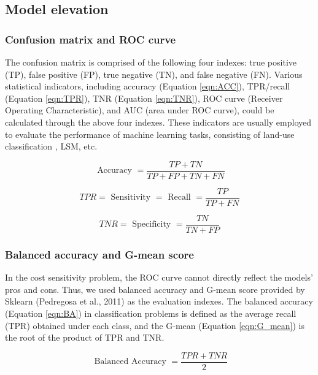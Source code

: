 \documentclass[a4paper,fleqn]{cas-sc}
\begin{document}
\subsection{Model elevation}
\subsubsection{Confusion matrix and ROC curve}

The confusion matrix is comprised of the following four indexes: true positive (TP), false positive (FP), true negative (TN), and false negative (FN). 
Various statistical indicators, including accuracy (Equation \ref{eqn:ACC}), TPR/recall (Equation \ref{eqn:TPR}), TNR (Equation \ref{eqn:TNR}), ROC curve (Receiver Operating Characteristic), and AUC (area under ROC curve), could be calculated through the above four indexes. 
These indicators are usually employed to evaluate the performance of machine learning tasks, consisting of land-use classification \citep{Jr2014IJoGIS}, LSM, etc.

\begin{equation}
  \text { Accuracy }=\frac{T P+T N}{T P+F P+T N+F N}
  \label{eqn:ACC}
\end{equation}

\begin{equation}
  T P R=\text { Sensitivity }=\text { Recall }=\frac{T P}{T P+F N}
  \label{eqn:TPR}
\end{equation}

\begin{equation}
  T N R=\text { Specificity }=\frac{T N}{T N+F P}
  \label{eqn:TNR}
\end{equation}

\subsubsection{Balanced accuracy and G-mean score}

In the cost sensitivity problem, the ROC curve cannot directly reflect the models' pros and cons. 
Thus, we used balanced accuracy and G-mean score provided by Sklearn (Pedregosa et al., 2011) as the evaluation indexes. The balanced accuracy (Equation \ref{eqn:BA}) in classification problems is defined as the average recall (TPR) obtained under each class, and the G-mean (Equation \ref{eqn:G_mean}) is the root of the product of TPR and TNR. 

\begin{equation}
  \text { Balanced Accuracy }=\frac{T P R+T N R}{2}
  \label{eqn:BA}
\end{equation}
\end{document}
